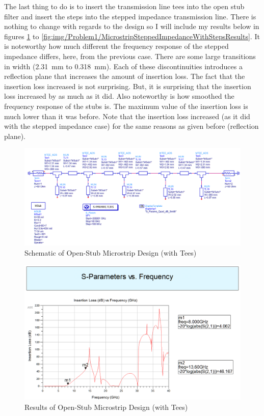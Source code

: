     The last thing to do is to insert the transmission line tees into the open
    stub filter and insert the steps into the stepped impedance transmission
    line. There is nothing to change with regards to the design so I will
    include my results below in figures
    \ref{fig:img/Problem1/MicrostripStubsWithTeesSchematic} to
    \ref{fig:img/Problem1/MicrostripSteppedImpedanceWithStepsResults}. It is
    noteworthy how much different the frequency response of the stepped
    impedance differs, here, from the previous case. There are some large
    transitions in width (\SI{2.31}{mm} to \SI{.318}{mm}). Each of these
    discontinuities introduces a reflection plane that increases the amount of
    insertion loss. The fact that the insertion loss increased is not
    surprising. But, it is surprising that the insertion loss increased by as
    much as it did. Also noteworthy is how smoothed the frequency response of
    the stubs is. The maximum value of the insertion loss is much lower than it
    was before. Note that the insertion loss increased (as it did with the
    stepped impedance case) for the same reasons as given before (reflection
    plane).

    \begin{figure}[H]
        \centering
        \includegraphics[width=0.8\linewidth]{img/Problem1/MicrostripStubsWithTeesSchematic.PNG}
        \caption{Schematic of Open-Stub Microstrip Design (with Tees)}
        \label{fig:img/Problem1/MicrostripStubsWithTeesSchematic}
    \end{figure}

    \begin{figure}[H]
        \centering
        \includegraphics[width=0.8\linewidth]{img/Problem1/MicrostripStubsWithTeesResults.PNG}
        \caption{Results of Open-Stub Microstrip Design (with Tees)}
        \label{fig:img/Problem1/MicrostripStubsWithTeesResults}
    \end{figure}

